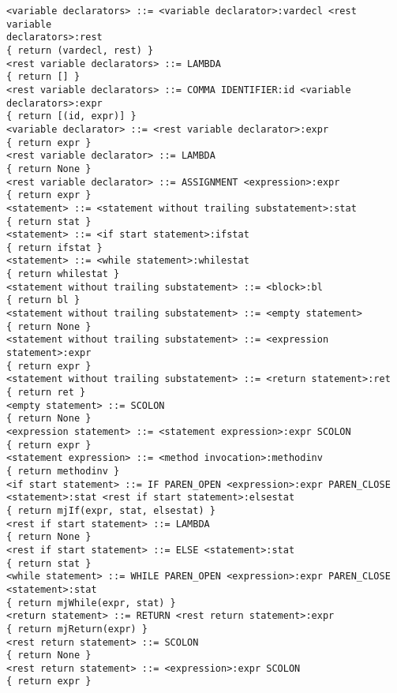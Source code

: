 \documentclass [a4paper,abstracton,titlepage]{scrartcl}
\begin{document}
\begin{lstlisting}
<variable declarators> ::= <variable declarator>:vardecl <rest variable
declarators>:rest
{ return (vardecl, rest) }
<rest variable declarators> ::= LAMBDA
{ return [] }
<rest variable declarators> ::= COMMA IDENTIFIER:id <variable declarators>:expr
{ return [(id, expr)] }
<variable declarator> ::= <rest variable declarator>:expr
{ return expr }
<rest variable declarator> ::= LAMBDA
{ return None }
<rest variable declarator> ::= ASSIGNMENT <expression>:expr
{ return expr }
<statement> ::= <statement without trailing substatement>:stat
{ return stat }
<statement> ::= <if start statement>:ifstat
{ return ifstat }
<statement> ::= <while statement>:whilestat
{ return whilestat }
<statement without trailing substatement> ::= <block>:bl
{ return bl }
<statement without trailing substatement> ::= <empty statement>
{ return None }
<statement without trailing substatement> ::= <expression statement>:expr
{ return expr }
<statement without trailing substatement> ::= <return statement>:ret
{ return ret }
<empty statement> ::= SCOLON
{ return None }
<expression statement> ::= <statement expression>:expr SCOLON
{ return expr }
<statement expression> ::= <method invocation>:methodinv
{ return methodinv }
<if start statement> ::= IF PAREN_OPEN <expression>:expr PAREN_CLOSE
<statement>:stat <rest if start statement>:elsestat
{ return mjIf(expr, stat, elsestat) }
<rest if start statement> ::= LAMBDA
{ return None }
<rest if start statement> ::= ELSE <statement>:stat
{ return stat }
<while statement> ::= WHILE PAREN_OPEN <expression>:expr PAREN_CLOSE
<statement>:stat
{ return mjWhile(expr, stat) }
<return statement> ::= RETURN <rest return statement>:expr
{ return mjReturn(expr) }
<rest return statement> ::= SCOLON
{ return None }
<rest return statement> ::= <expression>:expr SCOLON
{ return expr }
    \end{lstlisting}
\end{document}
